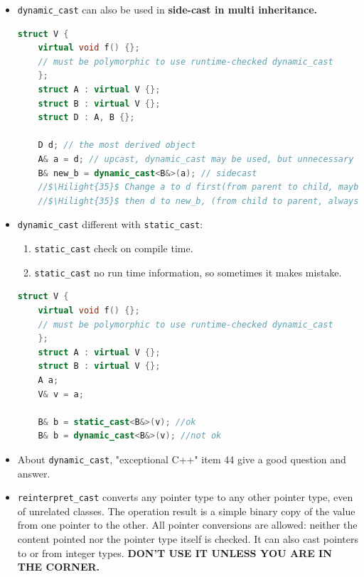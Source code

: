 \documentclass[a4paper,11pt,twoside]{book}
\newcommand{\Hilight}[1]{\makebox[0pt][l]{\color{yellow}\rule[-3pt]{#1em}{11pt}}}
\newcommand{\Hilight}[1]{}
\begin{document}
\begin{itemize}
	
	\item \texttt{dynamic\_cast} can also be used in \textbf{side-cast in multi inheritance. }
	\begin{lstlisting}[frame=single, language=c++, mathescape=true]
	struct V {
	virtual void f() {};
	// must be polymorphic to use runtime-checked dynamic_cast
	};
	struct A : virtual V {};
	struct B : virtual V {};
	struct D : A, B {};
	
	D d; // the most derived object
	A& a = d; // upcast, dynamic_cast may be used, but unnecessary
	B& new_b = dynamic_cast<B&>(a); // sidecast
	//$\Hilight{35}$ Change a to d first(from parent to child, maybe fail), 
	//$\Hilight{35}$ then d to new_b, (from child to parent, always succeed)
	\end{lstlisting}
	
	
	\item \texttt{dynamic\_cast} different with \texttt{static\_cast}:
	\begin{enumerate}
		\item \texttt{static\_cast} check on compile time.
		\item \texttt{static\_cast} no run time information, so sometimes it makes mistake.
	\end{enumerate}
	\begin{lstlisting}[frame=single, language=c++, mathescape=true]
	struct V {
	virtual void f() {};
	// must be polymorphic to use runtime-checked dynamic_cast
	};
	struct A : virtual V {};
	struct B : virtual V {};
	A a;
	V& v = a;
	
	B& b = static_cast<B&>(v); //ok
	B& b = dynamic_cast<B&>(v); //not ok
	\end{lstlisting}
	
	
	\item About \texttt{dynamic\_cast}, "exceptional C++" item 44 give a good question and answer.
	
	\item \texttt{reinterpret\_cast} converts any pointer type to any other pointer type, even of unrelated classes. The operation result is a simple binary copy of the value from one pointer to the other. All pointer conversions are allowed: neither the content pointed nor the pointer type itself is checked. It can also cast pointers to or from integer types. \textbf{DON'T USE IT UNLESS YOU ARE IN THE CORNER.}
\end{itemize}
\end{document}
